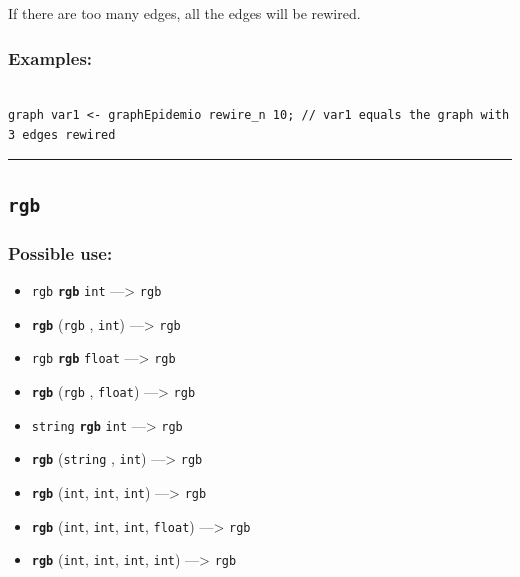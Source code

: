 \documentclass[]{book}
\providecommand{\tightlist}{%
  \setlength{\itemsep}{0pt}\setlength{\parskip}{0pt}}
\theoremstyle{definition}
\theoremstyle{definition}
\theoremstyle{definition}
\theoremstyle{remark}
\begin{document}
If there are too many edges, all the edges will be rewired.

\subsubsection{Examples:}\label{examples-299}

\begin{verbatim}
 
graph var1 <- graphEpidemio rewire_n 10; // var1 equals the graph with 3 edges rewired
\end{verbatim}

\begin{center}\rule{0.5\linewidth}{\linethickness}\end{center}

\subsection{\texorpdfstring{\texttt{rgb}}{rgb}}\label{rgb}

\subsubsection{Possible use:}\label{possible-use-437}

\begin{itemize}
\tightlist
\item
  \texttt{rgb} \textbf{\texttt{rgb}} \texttt{int} ---\textgreater{}
  \texttt{rgb}
\item
  \textbf{\texttt{rgb}} (\texttt{rgb} , \texttt{int}) ---\textgreater{}
  \texttt{rgb}
\item
  \texttt{rgb} \textbf{\texttt{rgb}} \texttt{float} ---\textgreater{}
  \texttt{rgb}
\item
  \textbf{\texttt{rgb}} (\texttt{rgb} , \texttt{float})
  ---\textgreater{} \texttt{rgb}
\item
  \texttt{string} \textbf{\texttt{rgb}} \texttt{int} ---\textgreater{}
  \texttt{rgb}
\item
  \textbf{\texttt{rgb}} (\texttt{string} , \texttt{int})
  ---\textgreater{} \texttt{rgb}
\item
  \textbf{\texttt{rgb}} (\texttt{int}, \texttt{int}, \texttt{int})
  ---\textgreater{} \texttt{rgb}
\item
  \textbf{\texttt{rgb}} (\texttt{int}, \texttt{int}, \texttt{int},
  \texttt{float}) ---\textgreater{} \texttt{rgb}
\item
  \textbf{\texttt{rgb}} (\texttt{int}, \texttt{int}, \texttt{int},
  \texttt{int}) ---\textgreater{} \texttt{rgb}
\end{itemize}
\end{document}
